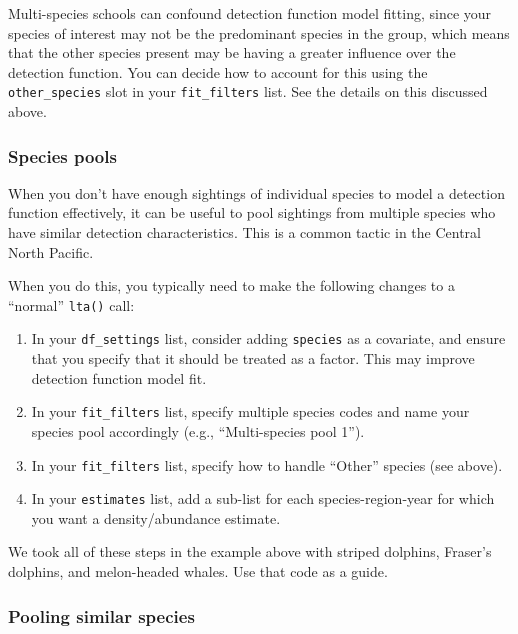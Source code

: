 \documentclass[
]{book}
\begin{document}
Multi-species schools can confound detection function model fitting, since your species of interest may not be the predominant species in the group, which means that the other species present may be having a greater influence over the detection function. You can decide how to account for this using the \texttt{other\_species} slot in your \texttt{fit\_filters} list. See the details on this discussed above.

\hypertarget{species-pools}{%
\subsubsection*{Species pools}\label{species-pools}}

When you don't have enough sightings of individual species to model a detection function effectively, it can be useful to pool sightings from multiple species who have similar detection characteristics. This is a common tactic in the Central North Pacific.

When you do this, you typically need to make the following changes to a ``normal'' \texttt{lta()} call:

\begin{enumerate}
\def\labelenumi{(\arabic{enumi})}
\item
  In your \texttt{df\_settings} list, consider adding \texttt{species} as a covariate, and ensure that you specify that it should be treated as a factor. This may improve detection function model fit.
\item
  In your \texttt{fit\_filters} list, specify multiple species codes and name your species pool accordingly (e.g., ``Multi-species pool 1'').
\item
  In your \texttt{fit\_filters} list, specify how to handle ``Other'' species (see above).
\item
  In your \texttt{estimates} list, add a sub-list for each species-region-year for which you want a density/abundance estimate.
\end{enumerate}

We took all of these steps in the example above with striped dolphins, Fraser's dolphins, and melon-headed whales. Use that code as a guide.

\hypertarget{pooling-similar-species}{%
\subsubsection*{Pooling similar species}\label{pooling-similar-species}}
\end{document}
